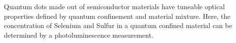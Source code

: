 
Quantum dots made out of semiconductor materials have tuneable optical properties defined by quantum confinement and material mixture. 
Here, the concentration of Selenium and Sulfur in a quantum confined material can be determined by a photoluminescence measurement.